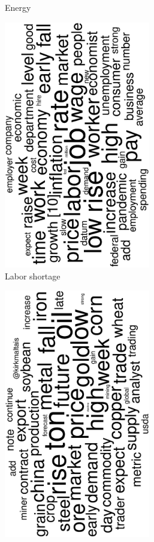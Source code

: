 \begin{figure}
\begin{subfigure}{0.32\textwidth}
		\caption{Energy}
	\end{subfigure}
	\begin{subfigure}{0.32\textwidth}
		\includegraphics[width=0.7\textwidth,angle=270]{figures/wordcloud4.eps}
		\caption{Labor shortage}
	\end{subfigure}
	\begin{subfigure}{0.32\textwidth}
		\includegraphics[width=0.7\textwidth,angle=270]{figures/wordcloud14.eps}

\end{subfigure}
\end{figure}
